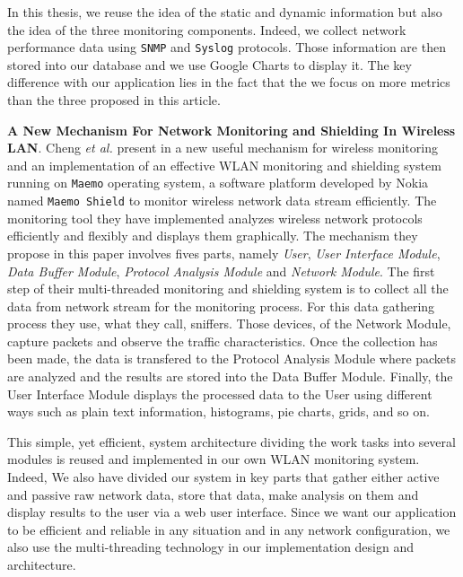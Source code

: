 In this thesis, we reuse the idea of the static and dynamic information but also the idea of the three monitoring components. Indeed, we collect network performance data using \texttt{SNMP} and \texttt{Syslog} protocols. Those information are then stored into our database and we use Google Charts to display it. The key difference with our application lies in the fact that the we focus on more metrics than the three proposed in this article.


\textbf{A New Mechanism For Network Monitoring and Shielding In Wireless LAN}. Cheng \textit{et al.} present in \cite{article2} a new useful mechanism for wireless monitoring and an implementation of an effective WLAN monitoring and shielding system running on \texttt{Maemo} operating system, a software platform developed by Nokia named \texttt{Maemo Shield} to monitor wireless network data stream efficiently. The monitoring tool they have implemented analyzes wireless network protocols efficiently and flexibly and displays them graphically. The mechanism they propose in this paper involves fives parts, namely \textit{User}, \textit{User Interface Module}, \textit{Data Buffer Module}, \textit{Protocol Analysis Module} and \textit{Network Module}. The first step of their multi-threaded monitoring and shielding system is to collect all the data from network stream for the monitoring process. For this data gathering process they use, what they call, sniffers. Those devices, of the Network Module, capture packets and observe the traffic characteristics. Once the collection has been made, the data is transfered to the Protocol Analysis Module where packets are analyzed and the results are stored into the Data Buffer Module. Finally, the User Interface Module displays the processed data to the User using different ways such as plain text information, histograms, pie charts, grids, and so on.

This simple, yet efficient, system architecture dividing the work tasks into several modules is reused and implemented in our own WLAN monitoring system. Indeed, We also have divided our system in key parts that gather either active and passive raw network data, store that data, make analysis on them and display results to the user via a web user interface. Since we want our application to be efficient and reliable in any situation and in any network configuration, we also use the multi-threading technology in our implementation design and architecture.


